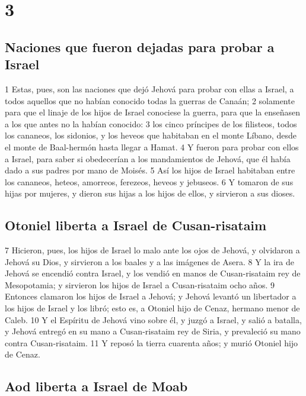 \chapter{3}

\section*{Naciones que fueron dejadas para probar a Israel}

1 Estas, pues, son las naciones que dejó Jehová para probar con ellas a Israel, a todos aquellos que no habían conocido todas la guerras de Canaán;
2 solamente para que el linaje de los hijos de Israel conociese la guerra, para que la enseñasen a los que antes no la habían conocido:
3 los cinco príncipes de los filisteos, todos los cananeos, los sidonios, y los heveos que habitaban en el monte Líbano, desde el monte de Baal-hermón hasta llegar a Hamat.
4 Y fueron para probar con ellos a Israel, para saber si obedecerían a los mandamientos de Jehová, que él había dado a sus padres por mano de Moisés.
5 Así los hijos de Israel habitaban entre los cananeos, heteos, amorreos, ferezeos, heveos y jebuseos.
6 Y tomaron de sus hijas por mujeres, y dieron sus hijas a los hijos de ellos, y sirvieron a sus dioses.

\section*{Otoniel liberta a Israel de Cusan-risataim}

7 Hicieron, pues, los hijos de Israel lo malo ante los ojos de Jehová, y olvidaron a Jehová su Dios, y sirvieron a los baales y a las imágenes de Asera.
8 Y la ira de Jehová se encendió contra Israel, y los vendió en manos de Cusan-risataim rey de Mesopotamia; y sirvieron los hijos de Israel a Cusan-risataim ocho años.
9 Entonces clamaron los hijos de Israel a Jehová; y Jehová levantó un libertador a los hijos de Israel y los libró; esto es, a Otoniel hijo de Cenaz, hermano menor de Caleb.
10 Y el Espíritu de Jehová vino sobre él, y juzgó a Israel, y salió a batalla, y Jehová entregó en su mano a Cusan-risataim rey de Siria, y prevaleció su mano contra Cusan-risataim.
11 Y reposó la tierra cuarenta años; y murió Otoniel hijo de Cenaz.

\section*{Aod liberta a Israel de Moab}

